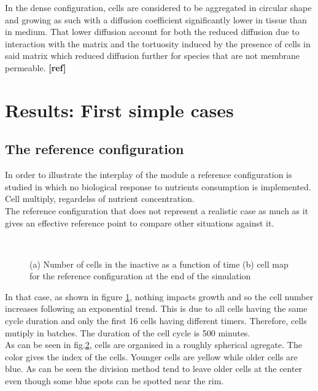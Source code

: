 \documentclass[11pt,a4paper]{article}
\begin{document}
In the dense configuration, cells are considered to be aggregated in circular shape and growing as such with a diffusion coefficient significantly lower in tissue than in medium. That lower diffusion account for both the reduced diffusion due to interaction with the matrix and the tortuosity induced by the presence of cells in said matrix which reduced diffusion further for species that are not membrane permeable. \textbf{[ref]}  

\section{Results: First simple cases}
\subsection{The reference configuration}
In order to illustrate the interplay of the module a reference configuration is studied in which no biological response to nutrients consumption is implemented. Cell multiply, regardelss of nutrient concentration.\\

The reference configuration that does not represent a realistic case as much as it gives an effective reference point to compare other situations against it.\\


\begin{figure}[ht!]
\begin{subfigure}{0.5\textwidth}
	\centering
	
	\caption{ \label{ref_conf_area}}
\end{subfigure}
~~
\begin{subfigure}{0.5\textwidth}
	\centering
	
	\caption{\label{ref_conf_Grid}}
\end{subfigure}
\caption{(a) Number of cells in the inactive as a function of time (b) cell map for the reference configuration at the end of the simulation \label{area_Grid}}
\end{figure}

In that case, as shown in figure \ref{ref_conf_area}, nothing impacts growth and so the cell number increases following an exponential trend. This is due to all cells having the same cycle duration and only the first 16 cells having different timers. Therefore, cells mutiply in batches. The duration of the cell cycle is 500 minutes.\\

As can be seen in fig.\ref{ref_conf_Grid}, cells are organised in a roughly spherical agregate. The color gives the index of the cells. Younger cells are yellow while older cells are blue. As can be seen the division method tend to leave older cells at the center even though some blue spots can be spotted near the rim. \\ 
\end{document}
